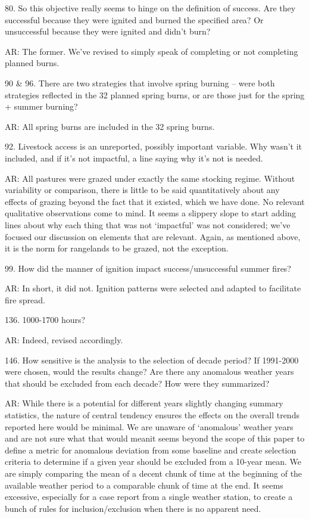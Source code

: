 \documentclass[parskip=half, american]{scrartcl}
\newcommand{\AR}[1]
	{\color{PineGreen}AR: #1\color{black} \par }
\begin{document}
80.  So this objective really seems to hinge on the definition of success.  Are they successful because they were ignited and burned the specified area? Or unsuccessful because they were ignited and didn't burn?  

\AR{The former. We've revised to simply speak of completing or not completing planned burns.  }

90 \& 96.  There are two strategies that involve spring burning – were both strategies reflected in the 32 planned spring burns, or are those just for the spring + summer burning?  

\AR{All spring burns are included in the 32 spring burns.  }

92.  Livestock access is an unreported, possibly important variable.  Why wasn't it included, and if it’s not impactful, a line saying why it’s not is needed.

\AR{All pastures were grazed under exactly the same stocking regime. 
Without variability or comparison, there is little to be said quantitatively about any effects of grazing beyond the fact that it existed, which we have done. No relevant qualitative observations come to mind. It seems a slippery slope to start adding lines about why each thing that was not `impactful' was not considered; we've focused our discussion on elements that are relevant.
Again, as mentioned above, it is the norm for rangelands to be grazed, not the exception.  }

99.  How did the manner of ignition impact success/unsuccessful summer fires?

\AR{In short, it did not. Ignition patterns were selected and adapted to facilitate fire spread. }

136.  1000-1700 hours? 

\AR{ Indeed, revised accordingly. }

146. How sensitive is the analysis to the selection of decade period?  If 1991-2000 were chosen, would the results change?  Are there any anomalous weather years that should be excluded from each decade? How were they summarized?

\AR{While there is a potential for different years slightly changing summary statistics, the nature of central tendency ensures the effects on the overall trends reported here would be minimal. 
We are unaware of `anomalous' weather years and are not sure what that would mean\textemdash it seems beyond the scope of this paper to define a metric for anomalous deviation from some baseline and create selection criteria to determine if a given year should be excluded from a 10-year mean. 
We are simply comparing the mean of a decent chunk of time at the beginning of the available weather period to a comparable chunk of time at the end. 
It seems excessive, especially for a case report from a single weather station, to create a bunch of rules for inclusion/exclusion when there is no apparent need.    }
\end{document}
